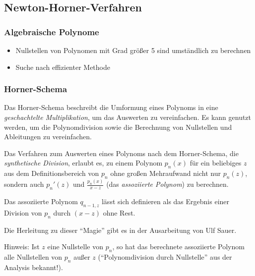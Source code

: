 \documentclass[a4paper, 12pt]{article}
\begin{document}
\subsection{Newton-Horner-Verfahren}

\subsubsection*{Algebraische Polynome}
\begin{itemize}
  \item Nullstellen von Polynomen mit Grad größer 5 sind umständlich zu berechnen
  \item Suche nach effizienter Methode
\end{itemize}

\subsubsection*{Horner-Schema}
Das Horner-Schema beschreibt die Umformung eines Polynoms in eine \emph{geschachtelte Multiplikation}, um das Auswerten zu vereinfachen. Es kann genutzt werden, um die Polynomdivision sowie die Berechnung von Nullstellen und Ableitungen zu vereinfachen.

Das Verfahren zum Auswerten eines Polynoms nach dem Horner-Schema, die \emph{synthetische Division}, erlaubt es, zu einem Polynom \(p_n(x)\) für ein beliebiges \(z\) aus dem Definitionsbereich von \(p_n\) ohne großen Mehraufwand nicht nur \(p_n(z)\), sondern auch \(p_n'(z)\) und \(\frac{p_n(x)}{x-z}\) (das \emph{assoziierte Polynom}) zu berechnen.

Das assoziierte Polynom \(q_{n-1,z}\) lässt sich definieren als das Ergebnis einer Division von \(p_n\) durch \((x-z)\) ohne Rest.

Die Herleitung zu dieser ``Magie'' gibt es in der Ausarbeitung von Ulf Sauer.

Hinweis: Ist \(z\) eine Nullstelle von \(p_n\), so hat das berechnete assoziierte Polynom alle Nullstellen von \(p_n\) außer \(z\) (``Polynomdivision durch Nullstelle'' aus der Analysis bekannt!).
\end{document}
